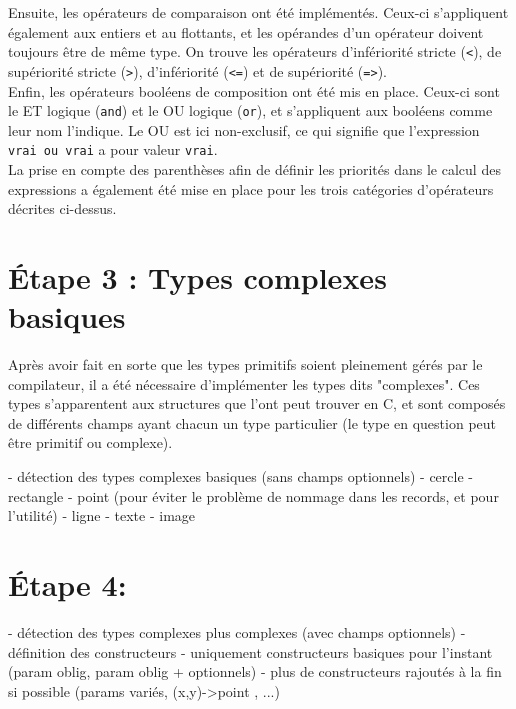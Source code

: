 \documentclass[a4paper, 12pt]{report}
\begin{document}
	Ensuite, les opérateurs de comparaison ont été  implémentés. Ceux-ci s'appliquent également aux entiers et au flottants, et les opérandes d'un opérateur doivent toujours être de même type. On trouve les opérateurs d'infériorité stricte (\texttt{<}), de supériorité stricte (\texttt{>}), d'infériorité (\texttt{<=}) et de supériorité (\texttt{=>}).\\
	
	Enfin, les opérateurs booléens de composition ont été mis en place. Ceux-ci sont le ET logique (\texttt{and}) et le OU logique (\texttt{or}), et s'appliquent aux booléens comme leur nom l'indique. Le OU est ici non-exclusif, ce qui signifie que l'expression \texttt{vrai ou vrai} a pour valeur \texttt{vrai}.\\
	
	La prise en compte des parenthèses afin de définir les priorités dans le calcul des expressions a également été mise en place pour les trois catégories d'opérateurs décrites ci-dessus.
    
\chapter{\'Etape 3 : Types complexes basiques}

	Après avoir fait en sorte que les types primitifs soient pleinement gérés par le compilateur, il a été nécessaire d'implémenter les types dits "complexes". Ces types s'apparentent aux structures que l'ont peut trouver en C, et sont composés de différents champs ayant chacun un type particulier (le type en question peut être primitif ou complexe).

    - détection des types complexes basiques (sans champs optionnels)
    	- cercle
        - rectangle
        	- point (pour éviter le problème de nommage dans les records, et pour l'utilité)
        - ligne
        - texte
        - image
        
\chapter{\'Etape 4: }

    - détection des types complexes plus complexes (avec champs optionnels)
    	- définition des constructeurs
        	- uniquement constructeurs basiques pour l'instant (param oblig, param oblig + optionnels)
            - plus de constructeurs rajoutés à la fin si possible (params variés, (x,y)->point , ...)
   
\end{document}
